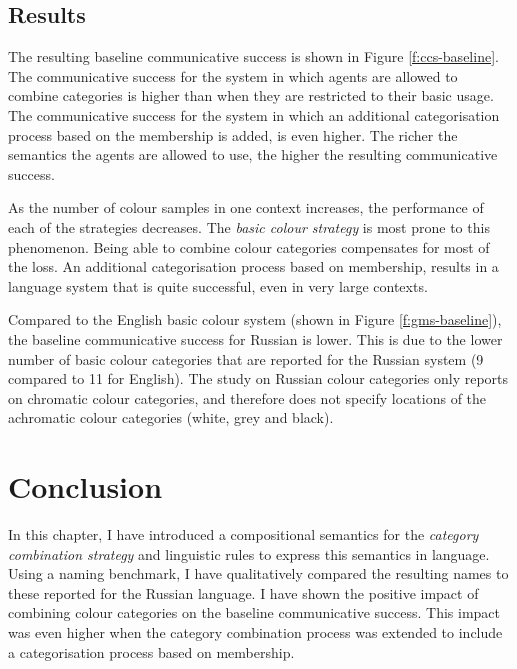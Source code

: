 \subsection{Results}

The resulting baseline communicative success is shown in Figure
\ref{f:ccs-baseline}. The communicative success for the system in
which agents are allowed to combine categories is higher than when
they are restricted to their basic usage. The communicative success
for the system in which an additional categorisation process based on
the membership is added, is even higher. The richer the semantics the
agents are allowed to use, the higher the resulting communicative
success.

As the number of colour samples in one context increases, the
performance of each of the strategies decreases. The \emph{basic
  colour strategy} is most prone to this phenomenon. Being able to
combine colour categories compensates for most of the loss. An
additional categorisation process based on membership, results in a
language system that is quite successful, even in very large contexts.

Compared to the English basic colour system (shown in Figure
\ref{f:gms-baseline}), the baseline communicative success for Russian
is lower. This is due to the lower number of basic colour categories
that are reported for the Russian system (9 compared to 11 for
English). The study on Russian colour categories only reports on
chromatic colour categories, and therefore does not specify locations
of the achromatic colour categories (white, grey and black).


\section{Conclusion}

In this chapter, I have introduced a compositional semantics for the
\emph{category combination strategy} and linguistic rules to express
this semantics in language. Using a naming benchmark, I have
qualitatively compared the resulting names to these reported for the
Russian language. I have shown the positive impact of combining
colour categories on the baseline communicative success. This impact
was even higher when the category combination process was extended
to include a categorisation process based on membership.

\newpage
\thispagestyle{empty}
